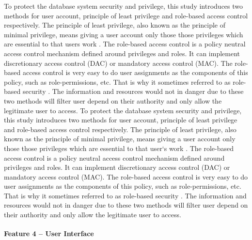 \documentclass[a4paper]{article} %
\begin{document}
	To protect the database system security and privilege, this study introduces two methods for user account, principle of least privilege and role-based access control respectively. The principle of least privilege, also known as the principle of minimal privilege, means giving a user account only those those privileges which are essential to that users work \cite{PrincipleLeastPrivilege}. The role-based access control is a policy neutral access control mechanism defined around privileges and roles. It can implement discretionary access control (DAC) or mandatory access control (MAC). The role-based access control is very easy to do user assignments as the components of this policy, such as role-permissions, etc. That is why it sometimes referred to as role-based security \cite{RoleBasedAccessControl}. The information and resources would not in danger due to these two methods will filter user depend on their authority and only allow the legitimate user to access.	
	To protect the database system security and privilege, this study introduces two methods for user account, principle of least privilege and role-based access control respectively. The principle of least privilege, also known as the principle of minimal privilege, means giving a user account only those those privileges which are essential to that user`s work \cite{PrincipleLeastPrivilege}. The role-based access control is a policy neutral access control mechanism defined around privileges and roles. It can implement discretionary access control (DAC) or mandatory access control (MAC). The role-based access control is very easy to do user assignments as the components of this policy, such as role-permissions, etc. That is why it sometimes referred to as role-based security \cite{RoleBasedAccessControl}. The information and resources would not in danger due to these two methods will filter user depend on their authority and only allow the legitimate user to access.
	
	\paragraph*{Feature 4 -- User Interface}
	\label{task1:feature4}
	
\end{document}
